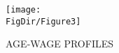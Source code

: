 \hypertarget{HCprodfuncAgeWageProfiles}{}
\begin{figure}[tbp]
   \centerline{\texttt{[image: \\FigDir/Figure3]}}
  \caption{AGE-WAGE PROFILES}
  \label{fig:AgeWageProfiles}
\end{figure}
